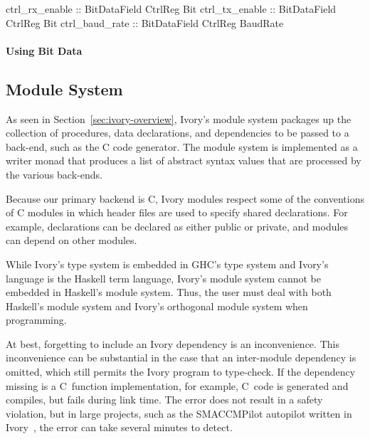 \begin{code}
ctrl_rx_enable :: BitDataField CtrlReg Bit
ctrl_tx_enable :: BitDataField CtrlReg Bit
ctrl_baud_rate :: BitDataField CtrlReg BaudRate
\end{code}

\paragraph{Using Bit Data}

\subsection{Module System}
\label{sec:modules}

As seen in Section~\ref{sec:ivory-overview}, Ivory's module system packages up
the collection of procedures, data declarations, and dependencies to be passed
to a back-end, such as the C code generator. The module system is implemented as
a writer monad that produces a list of abstract syntax values that are processed
by the various back-ends.

Because our primary backend is C, Ivory modules respect some of the conventions
of C modules in which header files are used to specify shared declarations. For
example, declarations can be declared as either public or private, and modules
can depend on other modules.

While Ivory's type system is embedded in GHC's type system and Ivory's language
is the Haskell term language, Ivory's module system cannot be embedded in
Haskell's module system. Thus, the user must deal with both Haskell's module
system and Ivory's orthogonal module system when programming.

At best, forgetting to include an Ivory dependency is an inconvenience. This
inconvenience can be substantial in the case that an inter-module dependency is
omitted, which still permits the Ivory program to type-check. If the dependency
missing is a C~function implementation, for example, C~code is generated and
compiles, but fails during link time. The error does not result in a safety
violation, but in large projects, such as the SMACCMPilot autopilot written in
Ivory~\cite{}, the error can take several minutes to detect.

